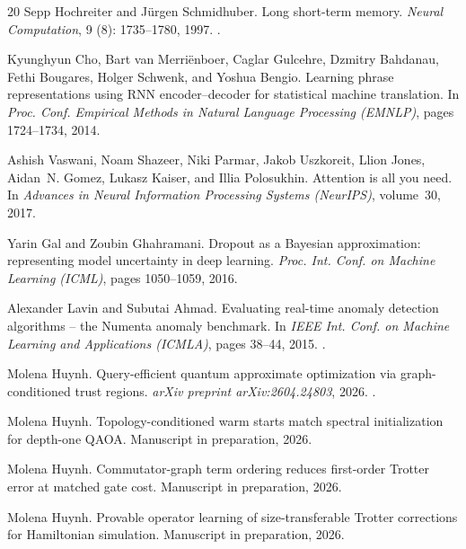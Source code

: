 \documentclass[
  aps,
  prresearch,
  reprint,
  amsmath,
  amssymb,
  nofootinbib,
  floatfix,
]{revtex4-2}
\begin{document}
\begin{thebibliography}{20}
Sepp Hochreiter and J{\"u}rgen Schmidhuber.
\newblock Long short-term memory.
\newblock \emph{Neural Computation}, 9 (8): 1735--1780, 1997.
\newblock {}.

Kyunghyun Cho, Bart van Merri{\"e}nboer, Caglar Gulcehre, Dzmitry Bahdanau,
  Fethi Bougares, Holger Schwenk, and Yoshua Bengio.
\newblock Learning phrase representations using {RNN} encoder--decoder for
  statistical machine translation.
\newblock In \emph{Proc. Conf. Empirical Methods in Natural Language Processing
  (EMNLP)}, pages 1724--1734, 2014.

Ashish Vaswani, Noam Shazeer, Niki Parmar, Jakob Uszkoreit, Llion Jones,
  Aidan~N. Gomez, Lukasz Kaiser, and Illia Polosukhin.
\newblock Attention is all you need.
\newblock In \emph{Advances in Neural Information Processing Systems
  (NeurIPS)}, volume~30, 2017.

Yarin Gal and Zoubin Ghahramani.
\newblock Dropout as a {Bayesian} approximation: representing model uncertainty
  in deep learning.
\newblock \emph{Proc. Int. Conf. on Machine Learning (ICML)}, pages 1050--1059,
  2016.

Alexander Lavin and Subutai Ahmad.
\newblock Evaluating real-time anomaly detection algorithms -- the {Numenta}
  anomaly benchmark.
\newblock In \emph{IEEE Int. Conf. on Machine Learning and Applications
  (ICMLA)}, pages 38--44, 2015.
\newblock {}.

Molena Huynh.
\newblock Query-efficient quantum approximate optimization via
  graph-conditioned trust regions.
\newblock \emph{arXiv preprint arXiv:2604.24803}, 2026.
\newblock {}.

Molena Huynh.
\newblock Topology-conditioned warm starts match spectral initialization for
  depth-one {QAOA}.
\newblock Manuscript in preparation, 2026.

Molena Huynh.
\newblock Commutator-graph term ordering reduces first-order {Trotter} error at
  matched gate cost.
\newblock Manuscript in preparation, 2026.

Molena Huynh.
\newblock Provable operator learning of size-transferable {Trotter}
  corrections for {Hamiltonian} simulation.
\newblock Manuscript in preparation, 2026.


\end{thebibliography}
\end{document}
